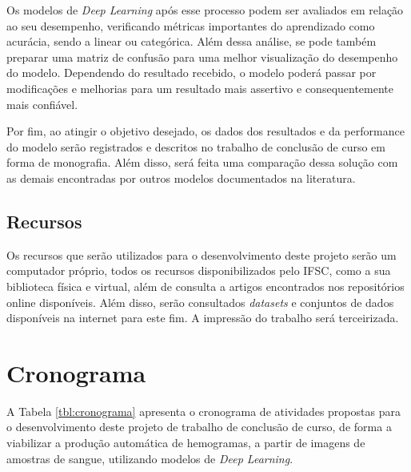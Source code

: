 Os modelos de \emph{Deep Learning} após esse processo podem ser avaliados em relação ao seu desempenho, verificando métricas importantes do aprendizado como acurácia, sendo a linear ou categórica. Além dessa análise, se pode também preparar uma matriz de confusão para uma melhor visualização do desempenho do modelo. Dependendo do resultado recebido, o modelo poderá passar por modificações e melhorias para um resultado mais assertivo e consequentemente mais confiável.

Por fim, ao atingir o objetivo desejado, os dados dos resultados e da performance do modelo serão registrados e descritos no trabalho de conclusão de curso em forma de monografia. Além disso, será feita uma comparação dessa solução com as demais encontradas por outros modelos documentados na literatura.

\section{Recursos}
\label{chap:recursos}

Os recursos que serão utilizados para o desenvolvimento deste projeto serão um computador próprio, todos os recursos disponibilizados pelo IFSC, como a sua biblioteca física e virtual, além de consulta a artigos encontrados nos repositórios online disponíveis. Além disso, serão consultados \emph{datasets} e conjuntos de dados disponíveis na internet para este fim. A impressão do trabalho será terceirizada.

\chapter{Cronograma}
\label{chap:cronograma}

A Tabela \ref{tbl:cronograma} apresenta o cronograma de atividades propostas para o desenvolvimento deste projeto de trabalho de conclusão de curso, de forma a viabilizar a produção automática de hemogramas, a partir de imagens de amostras de sangue, utilizando modelos de \emph{Deep Learning}.

